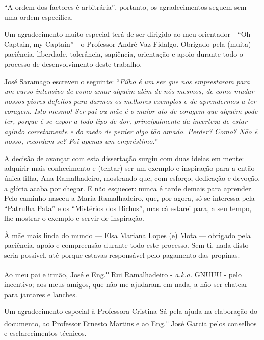 
\begin{acknowledgements}
``A ordem dos factores é arbitrária'', portanto, os agradecimentos seguem sem uma ordem específica.

Um agradecimento muito especial terá de ser dirigido ao meu orientador - ``Oh Captain, my Captain'' - o Professor André Vaz Fidalgo. Obrigado pela (muita) paciência, liberdade, tolerância, sapiência, orientação e apoio durante todo o processo de desenvolvimento deste trabalho.

José Saramago escreveu o seguinte: ``\textit{Filho é um ser que nos emprestaram para um curso intensivo de como amar alguém além de nós mesmos, de como mudar nossos piores defeitos para darmos os melhores exemplos e de aprendermos a ter coragem. Isto mesmo! Ser pai ou mãe é o maior ato de coragem que alguém pode ter, porque é se expor a todo tipo de dor, principalmente da incerteza de estar agindo corretamente e do medo de perder algo tão amado. Perder? Como? Não é nosso, recordam-se? Foi apenas um empréstimo.}''

A decisão de avançar com esta dissertação surgiu com duas ideias em mente: adquirir mais conhecimento e (tentar) ser um exemplo e inspiração para a então única filha, Ana Ramalhadeiro, mostrando que, com esforço, dedicação e devoção, a glória acaba por chegar. E não esquecer: nunca é tarde demais para aprender. Pelo caminho nasceu a Maria Ramalhadeiro, que, por agora, só se interessa pela ``Patrulha Pata'' e os ``Mistérios dos Bichos'', mas cá estarei para, a seu tempo, lhe mostrar o exemplo e servir de inspiração.

À mãe mais linda do mundo — Elsa Mariana Lopes (e) Mota — obrigado pela paciência, apoio e compreensão durante todo este processo. Sem ti, nada disto seria possível, até porque estavas responsável pelo pagamento das propinas.

Ao meu pai e irmão, José e Eng.\textsuperscript{o} Rui Ramalhadeiro - \textit{a.k.a.} GNUUU - pelo incentivo; aos meus amigos, que não me ajudaram em nada, a não ser chatear para jantares e lanches.

Um agradecimento especial à Professora Cristina Sá pela ajuda na elaboração do documento, ao Professor Ernesto Martins e ao Eng.\textsuperscript{o} José Garcia pelos conselhos e esclarecimentos técnicos.

\end{acknowledgements}
